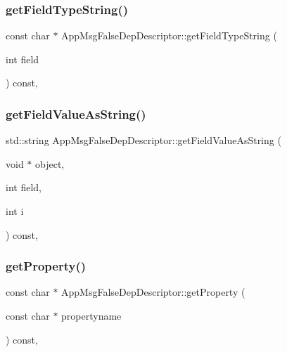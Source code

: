 \subsubsection{\texorpdfstring{get\+Field\+Type\+String()}{getFieldTypeString()}}
{\footnotesize\ttfamily const char $\ast$ App\+Msg\+False\+Dep\+Descriptor\+::get\+Field\+Type\+String (\begin{DoxyParamCaption}\item[{int}]{field }\end{DoxyParamCaption}) const\hspace{0.3cm}{\ttfamily [override]}, {\ttfamily [virtual]}}

\mbox{\label{class_app_msg_false_dep_descriptor_ac9b26b1e9c849df0e0259dfa3a38885c}} 
\subsubsection{\texorpdfstring{get\+Field\+Value\+As\+String()}{getFieldValueAsString()}}
{\footnotesize\ttfamily std\+::string App\+Msg\+False\+Dep\+Descriptor\+::get\+Field\+Value\+As\+String (\begin{DoxyParamCaption}\item[{void $\ast$}]{object,  }\item[{int}]{field,  }\item[{int}]{i }\end{DoxyParamCaption}) const\hspace{0.3cm}{\ttfamily [override]}, {\ttfamily [virtual]}}

\mbox{\label{class_app_msg_false_dep_descriptor_ac5650d0cbf554966c9fa8a1add231af7}} 
\subsubsection{\texorpdfstring{get\+Property()}{getProperty()}}
{\footnotesize\ttfamily const char $\ast$ App\+Msg\+False\+Dep\+Descriptor\+::get\+Property (\begin{DoxyParamCaption}\item[{const char $\ast$}]{propertyname }\end{DoxyParamCaption}) const\hspace{0.3cm}{\ttfamily [override]}, {\ttfamily [virtual]}}

